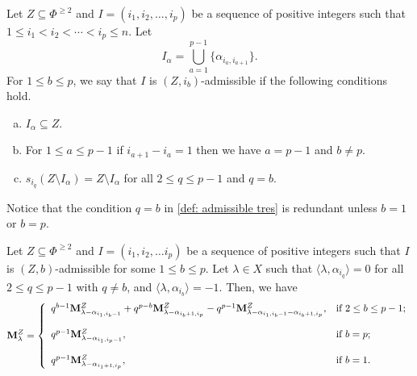 \begin{definition}\rm \label{def: admissible}
Let $Z\subseteq \Phi^{\geq 2}$ and $I = (i_{1},i_{2},\ldots , i_{p})$ be a sequence of positive integers such that $1\leq i_{1}< i_{2} < \cdots < i_{p}\leq n$. Let 
\begin{equation}
    I_\alpha = \bigcup\limits_{a=1}^{p-1} \{\alpha_{i_{a},i_{a+1}}\}.
\end{equation}
For $1\leq b\leq p$, we say that $I$ is $(Z,i_{b})$-admissible if the following conditions hold.
\begin{enumerate}[(a)]
\item \label{def: admissible uno} $I_\alpha\subseteq Z$.
\item \label{def: admissible dos} For $1\leq a \leq p-1$ if $i_{a+1}-i_a=1$ then we have $a=p-1$ and $b\neq p$. 
\item  \label{def: admissible tres} $s_{i_{q}}(Z\setminus I_{\alpha}) = Z\setminus I_{\alpha}$ for all $2\leq q \leq p-1$ and $q=b$.
\end{enumerate}
\end{definition}

\begin{remark}
    Notice that the condition  $q=b$ in \ref{def: admissible tres} is redundant unless $b=1$ or $b=p$.
\end{remark}


\begin{lemma}\rm\label{lem: desc admissible set.}
    Let $Z \subseteq \Phi^{\geq 2}$ and $I=(i_{1},i_{2},\ldots i_{p})$ be a sequence of positive integers such that $I$ is $(Z,b)$-admissible for some $1\leq b \leq p$. Let $\lambda \in X$ such that $\langle \lambda,\alpha_{i_{q}}\rangle = 0$ for all $2\leq q \leq p-1$ with $q\neq b$, and $\langle\lambda,\alpha_{i_b}\rangle = -1$. Then, we have
    \begin{equation} \label{eq: lema admisible set}
        \mathbf{M}_{\lambda}^{Z} = \left\{\begin{array}{ll}
            q^{b-1}\mathbf{M}_{\lambda - \alpha_{i_{1},i_{b}-1}}^{Z} + q^{p-b}\mathbf{M}_{\lambda - \alpha_{i_{b}+1,i_{p}}}^{Z} - q^{p-1}\mathbf{M}_{\lambda - \alpha_{i_{1},i_{b}-1} - \alpha_{i_{b}+1,i_{p}}}^{Z},  & \text{if } 2\leq b \leq p-1; \\
            & \\
            q^{p - 1 }\mathbf{M}_{\lambda - \alpha_{i_{1},i_{p}-1}}^{Z}, & \text{if } b=p;\\
            & \\
            q^{p - 1 }\mathbf{M}_{\lambda - \alpha_{i_{1}+1,i_{p}}}^{Z}, & \text{if } b=1.\\
        \end{array}\right.
    \end{equation}
\end{lemma}

